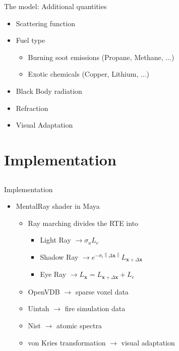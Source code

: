 \documentclass{beamer}
\newcommand{\x}{\mathbf{x}}
\newcommand{\deltax}{\left \|  \Delta \x \right \|}
\begin{document}
\begin{frame}{The model: Additional quantities}

\begin{itemize}
\setlength\itemsep{0.5em}
\item Scattering function
\item Fuel type
	\begin{itemize}
	\setlength\itemsep{0.5em}
	\item Burning soot emissions (Propane, Methane, ...)
	\item Exotic chemicals (Copper, Lithium, ...)
	\end{itemize}
\item Black Body radiation
\item Refraction
\item Visual Adaptation
\end{itemize}

\end{frame}

\section{Implementation}
\subsection{ }

\begin{frame}{Implementation}

\begin{itemize}
\setlength\itemsep{0.5em}
\item MentalRay shader in Maya
	\begin{itemize}
	\setlength\itemsep{0.5em}
	\item Ray marching divides the RTE into
		\begin{itemize}
		\setlength\itemsep{0.5em}
		\item Light Ray $\rightarrow \sigma_a L_e$
		\item Shadow Ray $\rightarrow e^{-\sigma_t \deltax} L_{\x + \Delta\x}$
		\item Eye Ray $\rightarrow L_{\x} = L_{\x + \Delta\x} + L_e$
		\end{itemize}
	\item OpenVDB $\rightarrow$ sparse voxel data
	\item Uintah $\rightarrow$ fire simulation data
	\item Nist $\rightarrow$ atomic spectra
	\item von Kries transformation $\rightarrow$ visual adaptation
	\end{itemize}
\end{itemize}

\end{frame}
\end{document}
